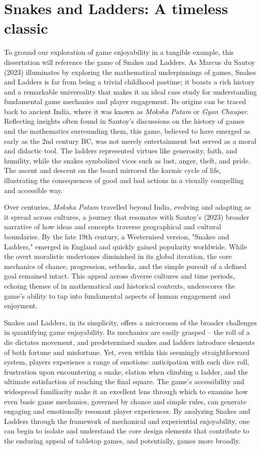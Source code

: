 \section{Snakes and Ladders: A timeless classic}
To ground our exploration of game enjoyability in a tangible example, this dissertation will reference the game of Snakes and Ladders. As Marcus du Sautoy (2023) illuminates by exploring the mathematical underpinnings of games, Snakes and Ladders is far from being a trivial childhood pastime; it boasts a rich history and a remarkable universality that makes it an ideal case study for understanding fundamental game mechanics and player engagement.  Its origins can be traced back to ancient India, where it was known as \textit{Moksha Patam} or \textit{Gyan Chaupar}.  Reflecting insights often found in Sautoy's discussions on the history of games and the mathematics surrounding them, this game, believed to have emerged as early as the 2nd century BC, was not merely entertainment but served as a moral and didactic tool. The ladders represented virtues like generosity, faith, and humility, while the snakes symbolized vices such as lust, anger, theft, and pride.  The ascent and descent on the board mirrored the karmic cycle of life, illustrating the consequences of good and bad actions in a visually compelling and accessible way.

Over centuries, \textit{Moksha Patam} travelled beyond India, evolving and adapting as it spread across cultures, a journey that resonates with Sautoy's (2023) broader narrative of how ideas and concepts traverse geographical and cultural boundaries. By the late 19th century, a Westernised version, "Snakes and Ladders," emerged in England and quickly gained popularity worldwide. While the overt moralistic undertones diminished in its global iteration, the core mechanics of chance, progression, setbacks, and the simple pursuit of a defined goal remained intact.  This appeal across diverse cultures and time periods, echoing themes of in mathematical and historical contexts, underscores the game's ability to tap into fundamental aspects of human engagement and enjoyment.

Snakes and Ladders, in its simplicity, offers a microcosm of the broader challenges in quantifying game enjoyability.  Its mechanics are easily grasped – the roll of a die dictates movement, and predetermined snakes and ladders introduce elements of both fortune and misfortune.  Yet, even within this seemingly straightforward system, players experience a range of emotions: anticipation with each dice roll, frustration upon encountering a snake, elation when climbing a ladder, and the ultimate satisfaction of reaching the final square.  The game’s accessibility and widespread familiarity make it an excellent lens through which to examine how even basic game mechanics, governed by chance and simple rules, can generate engaging and emotionally resonant player experiences. By analyzing Snakes and Ladders through the framework of mechanical and experiential enjoyability, one can begin to isolate and understand the core design elements that contribute to the enduring appeal of tabletop games, and potentially, games more broadly.